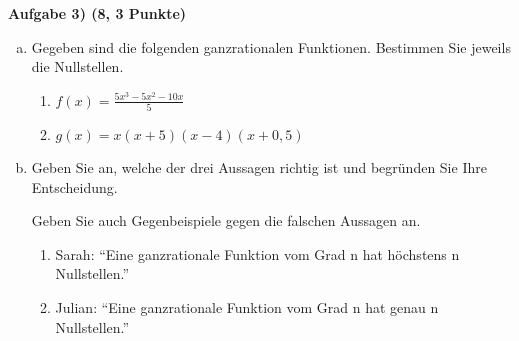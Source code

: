 \documentclass[a4paper,11pt, headsepline,headinclude, pagenumber=no]{scrreprt}
\newcommand{\Aufg}[3]{%
            \vspace{5mm} \textbf{Aufgabe #1  \hfill (#2 Punkte)} }
\begin{document}
\Aufg{3)}{8, 3}\\
\begin{enumerate}[a)]
 \item Gegeben sind die folgenden ganzrationalen Funktionen. Bestimmen Sie jeweils die Nullstellen.
  \begin{enumerate}[1.]
   \item $f(x)= \frac{5x^3-5x^2-10x}{5}$
   \item $g(x)= x(x+5)(x-4)(x+0,5)$
  \end{enumerate}
 \item Geben Sie an, welche der drei Aussagen richtig ist und begründen Sie Ihre Entscheidung.

Geben Sie auch Gegenbeispiele gegen die falschen Aussagen an.
 \begin{enumerate}[1.]
  \item Sarah:  \enquote{Eine ganzrationale Funktion vom Grad n hat höchstens n Nullstellen.}
  \item Julian: \enquote{Eine ganzrationale Funktion vom Grad n hat genau n Nullstellen.}
 \end{enumerate}

\end{enumerate}



{}
\end{document}

